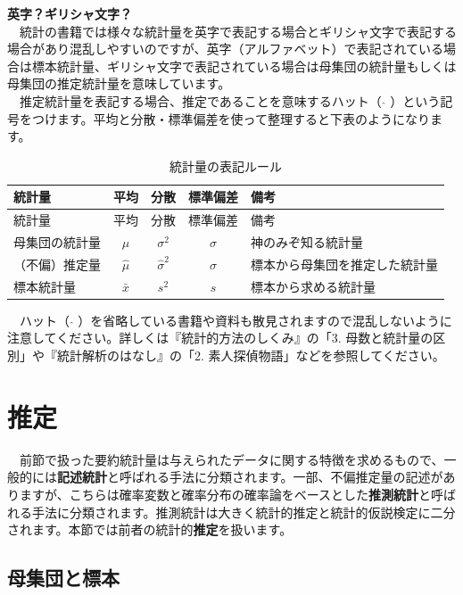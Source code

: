 \documentclass[
  12pt,
]{book}
\begin{document}
\begin{rmdnote}
\textbf{英字？ギリシャ文字？}\\
　統計の書籍では様々な統計量を英字で表記する場合とギリシャ文字で表記する場合があり混乱しやすいのですが、英字（アルファベット）で表記されている場合は標本統計量、ギリシャ文字で表記されている場合は母集団の統計量もしくは母集団の推定統計量を意味しています。\\
　推定統計量を表記する場合、推定であることを意味するハット（ \(\hat{}\) ）という記号をつけます。平均と分散・標準偏差を使って整理すると下表のようになります。

\begin{longtable}[]{@{}lcccl@{}}
\caption{統計量の表記ルール}\tabularnewline
\toprule
統計量 & 平均 & 分散 & 標準偏差 & 備考 \\
\midrule
\endfirsthead
\toprule
統計量 & 平均 & 分散 & 標準偏差 & 備考 \\
\midrule
\endhead
母集団の統計量 & \(\mu\) & \(\sigma^2\) & \(\sigma\) & 神のみぞ知る統計量 \\
（不偏）推定量 & \(\hat{\mu}\) & \(\hat{\sigma}^2\) & \(\hat{\sigma}\) & 標本から母集団を推定した統計量 \\
標本統計量 & \(\bar{x}\) & \(s^2\) & \(s\) & 標本から求める統計量 \\
\bottomrule
\end{longtable}
　ハット（ \(\hat{}\) ）を省略している書籍や資料も散見されますので混乱しないように注意してください。詳しくは『統計的方法のしくみ』\citep{ToukeitekiHouhounoSikumi:jbook}の「3. 母数と統計量の区別」や『統計解析のはなし』\citep{ToukeiKaisekinoHanashi}の「2. 素人探偵物語」などを参照してください。 \end{rmdnote}

\newpage

\hypertarget{ux63a8ux5b9a}{%
\section{推定}\label{ux63a8ux5b9a}}

　前節で扱った要約統計量は与えられたデータに関する特徴を求めるもので、一般的には\textbf{記述統計}と呼ばれる手法に分類されます。一部、不偏推定量の記述がありますが、こちらは確率変数と確率分布の確率論をベースとした\textbf{推測統計}と呼ばれる手法に分類されます。推測統計は大きく統計的推定と統計的仮説検定に二分されます。本節では前者の統計的\textbf{推定}を扱います。

\hypertarget{ux6bcdux96c6ux56e3ux3068ux6a19ux672c}{%
\subsection{母集団と標本}\label{ux6bcdux96c6ux56e3ux3068ux6a19ux672c}}
\end{document}
